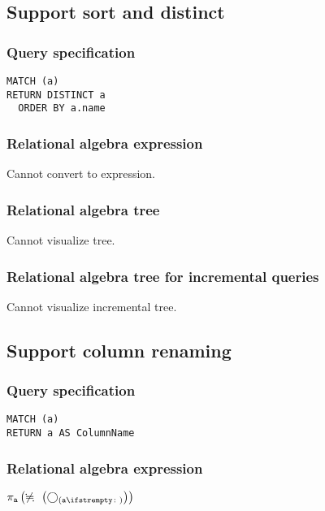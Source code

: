 \subsection{Support sort and distinct}

\subsubsection*{Query specification}

\begin{lstlisting}
MATCH (a)
RETURN DISTINCT a
  ORDER BY a.name
\end{lstlisting}

\subsubsection*{Relational algebra expression}

Cannot convert to expression.

\subsubsection*{Relational algebra tree}

Cannot visualize tree.

\subsubsection*{Relational algebra tree for incremental queries}

Cannot visualize incremental tree.

\subsection{Support column renaming}

\subsubsection*{Query specification}

\begin{lstlisting}
MATCH (a)
RETURN a AS ColumnName
\end{lstlisting}

\subsubsection*{Relational algebra expression}

$\projection{\var{a}} \left(\alldifferent{} \left(\getvertices{a}{}\right)\right)$

